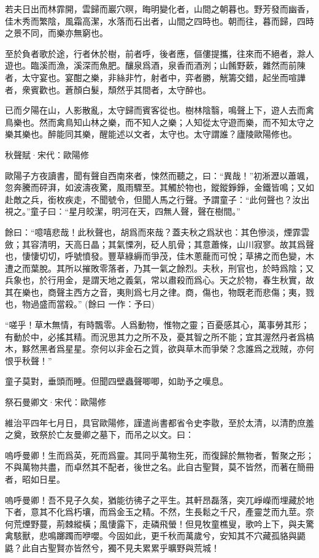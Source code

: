 \documentclass[12pt,a4paper]{ctexbook}
\begin{document}
若夫日出而林霏開，雲歸而巖穴暝，晦明變化者，山間之朝暮也。野芳發而幽香，佳木秀而繁陰，風霜高潔，水落而石出者，山間之四時也。朝而往，暮而歸，四時之景不同，而樂亦無窮也。\par
至於負者歌於途，行者休於樹，前者呼，後者應，傴僂提攜，往來而不絕者，滁人遊也。臨溪而漁，溪深而魚肥。釀泉爲酒，泉香而酒洌；山餚野蔌，雜然而前陳者，太守宴也。宴酣之樂，非絲非竹，射者中，弈者勝，觥籌交錯，起坐而喧譁者，衆賓歡也。蒼顏白髮，頹然乎其間者，太守醉也。\par
已而夕陽在山，人影散亂，太守歸而賓客從也。樹林陰翳，鳴聲上下，遊人去而禽鳥樂也。然而禽鳥知山林之樂，而不知人之樂；人知從太守遊而樂，而不知太守之樂其樂也。醉能同其樂，醒能述以文者，太守也。太守謂誰？廬陵歐陽修也。\par
秋聲賦·宋代：歐陽修 \par
歐陽子方夜讀書，聞有聲自西南來者，悚然而聽之，曰：“異哉！”初淅瀝以蕭颯，忽奔騰而砰湃，如波濤夜驚，風雨驟至。其觸於物也，鏦鏦錚錚，金鐵皆鳴；又如赴敵之兵，銜枚疾走，不聞號令，但聞人馬之行聲。予謂童子：“此何聲也？汝出視之。”童子曰：“星月皎潔，明河在天，四無人聲，聲在樹間。”\par
餘曰：“噫嘻悲哉！此秋聲也，胡爲而來哉？蓋夫秋之爲狀也：其色慘淡，煙霏雲斂；其容清明，天高日晶；其氣慄冽，砭人肌骨；其意蕭條，山川寂寥。故其爲聲也，悽悽切切，呼號憤發。豐草綠縟而爭茂，佳木蔥蘢而可悅；草拂之而色變，木遭之而葉脫。其所以摧敗零落者，乃其一氣之餘烈。夫秋，刑官也，於時爲陰；又兵象也，於行用金，是謂天地之義氣，常以肅殺而爲心。天之於物，春生秋實，故其在樂也，商聲主西方之音，夷則爲七月之律。商，傷也，物既老而悲傷；夷，戮也，物過盛而當殺。” (餘曰 一作：予曰)\par
“嗟乎！草木無情，有時飄零。人爲動物，惟物之靈；百憂感其心，萬事勞其形；有動於中，必搖其精。而況思其力之所不及，憂其智之所不能；宜其渥然丹者爲槁木，黟然黑者爲星星。奈何以非金石之質，欲與草木而爭榮？念誰爲之戕賊，亦何恨乎秋聲！”\par
童子莫對，垂頭而睡。但聞四壁蟲聲唧唧，如助予之嘆息。\par
祭石曼卿文·宋代：歐陽修 \par
維治平四年七月日，具官歐陽修，謹遣尚書都省令史李敭，至於太清，以清酌庶羞之奠，致祭於亡友曼卿之墓下，而吊之以文。曰：\par
嗚呼曼卿！生而爲英，死而爲靈。其同乎萬物生死，而復歸於無物者，暫聚之形；不與萬物共盡，而卓然其不配者，後世之名。此自古聖賢，莫不皆然，而著在簡冊者，昭如日星。\par
嗚呼曼卿！吾不見子久矣，猶能彷彿子之平生。其軒昂磊落，突兀崢嶸而埋藏於地下者，意其不化爲朽壤，而爲金玉之精。不然，生長鬆之千尺，產靈芝而九莖。奈何荒煙野蔓，荊棘縱橫；風悽露下，走磷飛螢！但見牧童樵叟，歌吟上下，與夫驚禽駭獸，悲鳴躑躅而咿嚶。今固如此，更千秋而萬歲兮，安知其不穴藏孤貉與鼯鼪？此自古聖賢亦皆然兮，獨不見夫累累乎曠野與荒城！\par
\end{document}
